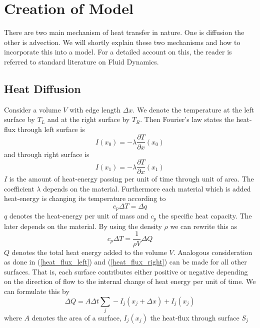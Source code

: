 \documentclass[]{article}
\begin{document}
\section{Creation of Model} \label{model_creation}
There are two main mechanism of heat transfer in nature. One is diffusion the other is advection. We will shortly explain these two mechanisms and how to incorporate this into a model. For a detailed account on this, the reader is referred to standard literature on Fluid Dynamics.\\
\subsection{Heat Diffusion}
Consider a volume $V$ with edge length $\Delta x$. We denote the temperature at the left surface by $T_L$ and at the right surface by $T_R$. Then Fourier's law states the heat-flux through left surface is
\begin{equation} \label{heat_flux_left}
I(x_0)=-\lambda\frac{\partial T}{\partial x}(x_0)
\end{equation}
and through right surface is
\begin{equation} \label{heat_flux_right}
I(x_1)=-\lambda\frac{\partial T}{\partial x}(x_1)
\end{equation}
$I$ is the amount of heat-energy passing per unit of time through unit of area.
The coefficient $\lambda$ depends on the material.
Furthermore each material which is added heat-energy is changing its temperature according to
\begin{equation*}
c_p \Delta T=\Delta q
\end{equation*}
$q$ denotes the heat-energy per unit of mass and $c_p$ the specific heat capacity. The later depends on the material. By using the density $\rho$ we can rewrite this as
\begin{equation} \label{specific_heat}
c_p \Delta T=\frac{1}{\rho V} \Delta Q
\end{equation}
$Q$ denotes the total heat energy added to the volume $V$.
Analogous consideration as done in (\ref{heat_flux_left}) and (\ref{heat_flux_right}) can be made for all other surfaces. That is, each surface
contributes either positive or negative depending on the direction of flow to the internal change of heat energy per unit of time.
We can formulate this by
\begin{equation*}
\Delta Q = A\Delta t \sum_{j}-I_{j}(x_{j}+\Delta x)+I_{j}(x_{j})
\end{equation*}
where $A$ denotes the area of a surface, $I_{j}(x_j)$ the heat-flux through surface $S_j$
\end{document}
